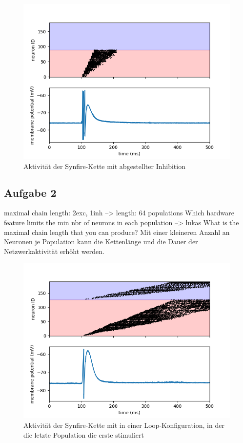 \documentclass[10pt,a4paper]{scrartcl}
\begin{document}
\begin{figure} [ht]
\begin{center}
\label{fig:abb4}
\caption{Aktivität der Synfire-Kette mit abgestellter Inhibition}
\includegraphics[scale=0.35]{pictures/synfire_chain_disable_inhibition.png}
\end{center}
\end{figure}


\subsection{Aufgabe 2}
maximal chain length: 2exc, 1inh --> length: 64 populations
Which hardware feature limits the min nbr of neurons in each population --> lukas
What is the maximal chain length that you can produce?
Mit einer kleineren Anzahl an Neuronen je Population kann die Kettenlänge und die Dauer der Netzwerkaktivität erhöht werden.

\begin{figure} [ht]
\begin{center}
\label{fig:abb4}
\caption{Aktivität der Synfire-Kette mit in einer Loop-Konfiguration, in der die letzte Population die erste stimuliert}
\includegraphics[scale=0.35]{pictures/chainlength_64.png}
\end{center}
\end{figure}
\end{document}
